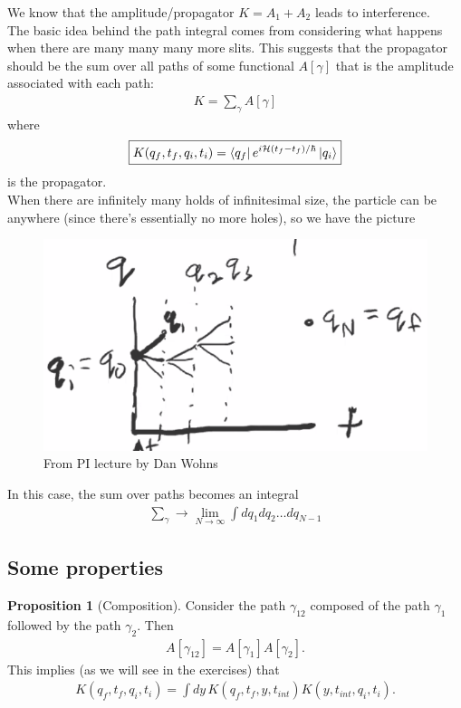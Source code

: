 \documentclass{book}
\theoremstyle{definition}
\newtheorem{prop}{Proposition}[section]
\newcommand{\had}{\mathcal{H}}
\begin{document}
We know that the amplitude/propagator $K = A_1 + A_2$ leads to interference. \\

The basic idea behind the path integral comes from considering what happens when there are many many many more slits. This suggests that the propagator should be the sum over all paths of some functional $A[\gamma]$ that is the amplitude associated with each path:
\begin{align}
K =\sum_\gamma A[\gamma]
\end{align}
where 
\begin{align}
\boxed{K(q_f,t_f, q_i,t_i) = \bra{q_f} e^{i\had (t_f - t_f)/\hbar} \ket{q_i}}
\end{align}
is the propagator. \\


When there are infinitely many holds of infinitesimal size, the particle can be anywhere (since there's essentially no more holes), so we have the picture
\begin{figure}[!htb]
	\centering
	\includegraphics[scale=0.5]{time}
	\caption{From PI lecture by Dan Wohns}
\end{figure}
In this case, the sum over paths becomes an integral
\begin{align}
\sum_\gamma \to \lim_{N\to \infty}\int d q_1dq_2\dots dq_{N-1}
\end{align}


\subsection{Some properties}

\begin{prop}[Composition]
	Consider the path $\gamma_{12}$ composed of the path $\gamma_1$ followed by the path $\gamma_2$. Then
\begin{align}
A[\gamma_{12}] = A[\gamma_1] A[\gamma_2].
\end{align}
This implies (as we will see in the exercises) that
\begin{align}
K(q_f,t_f,q_i,t_i) = \int dy\,K(q_f, t_f,y,t_{int})K(y,t_{int},q_i,t_i).
\end{align}
\end{prop}
\end{document}
